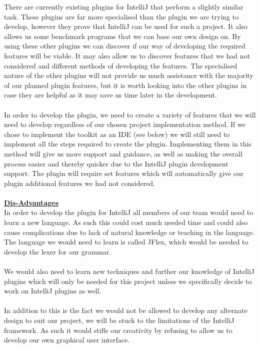  There are currently existing plugins for IntelliJ that perform a slightly similar task.  These plugins are far more specialised than the plugin we are trying to develop, however they prove that IntelliJ can be used for such a project. It also allows us some benchmark programs that we can base our own design on. By using these other plugins we can discover if our way of developing the required features will be viable. It may also allow us to discover features that we had not considered and different methods of developing the features. The specialised nature of the other plugins will not provide us much assistance with the majority of our planned plugin features, but it is worth looking into the other plugins in case they are helpful as it may save us time later in the development.\\
 \\
 In order to develop the plugin, we need to create a variety of features that we will need to develop regardless of our chosen project implementation method. If we chose to implement the toolkit as an IDE (see below) we will still need to implement all the steps required to create the plugin. Implementing them in this method will give us more support and guidance, as well as making the overall process easier and thereby quicker due to the IntelliJ plugin development support. The plugin will require set features which will automatically give our plugin additional features we had not considered. \\
 \\
 \textbf {\underline{Dis-Advantages}}\\
In order to develop the plugin for IntelliJ all members of our team would need to learn a new language. As such this could cost much needed time and could also cause complications due to lack of natural knowledge or teaching in the language. The language we would need to learn is called JFlex, which would be needed to develop the lexer for our grammar.\\
\\
We would also need to learn new techniques and further our knowledge of IntelliJ plugins which will only be needed for this project unless we specifically decide to work on IntelliJ plugins as well.\\
\\ 
In addition to this is the fact we would not be allowed to develop any alternate design to suit our project, we will be stuck to the limitations of the IntelliJ framework. As such it would stifle our creativity by refusing to allow us to develop our own graphical user interface. \\
